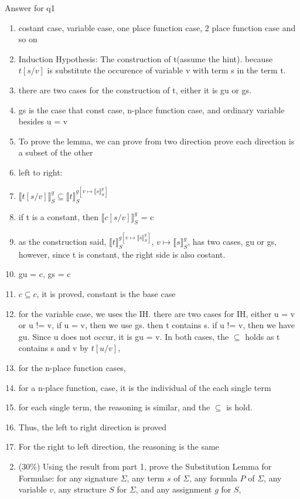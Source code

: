 \documentclass[10pt]{article}
\begin{document}
Answer for q1 
\begin{enumerate}
    \item costant case, variable case, one place function case, 2 place function case and so on 
    \item Induction Hypothesis: The construction of t(assume the hint). because $t[s/v]$ is substitute the occurence of variable v with term s in the term t. 
    \item there are two cases for the construction of t, either it is gu or gs. 
    \item gs is the case that const case, n-place function case, and ordinary variable besides u = v
    \item To prove the lemma, we can prove from two direction prove each direction is a subset of the other
    \item left to right:
    \item $\llbracket t[s / v] \rrbracket_{S}^{g} \subseteq \llbracket t \rrbracket_{S}^{g\left[v \mapsto \llbracket s \rrbracket_{S}^{g}\right]}$
    \item if t is a constant, then $\llbracket c[s / v] \rrbracket_{S}^{g}$ = c 
    \item as the construction said, $\llbracket t \rrbracket_{S}^{g\left[v \mapsto \llbracket s \rrbracket_{S}^{g}\right]}$, $v \mapsto \llbracket s \rrbracket_{S}^{g}$, has two cases, gu or gs, however, since t is constant, the right side is also costant.
    \item gu = c, gs = c 
    \item $c \subseteq c$, it is proved, constant is the base case 
    \item for the variable case, we uses the IH. there are two cases for IH, either u = v or u != v, if u = v, then we use gs. then t contains s. if u != v, then we have gu. Since u does not occur, it is gu = v. In both cases, the $\subseteq$ holds as t contains s and v by $t[u/v]$,
    \item for the n-place function cases, 
    \item for a n-place function, case, it is the individual of the each single term
    \item for each single term, the reasoning is similar, and the $\subseteq$ is hold. 
    \item Thus, the left to right direction is proved
    \item For the right to left direction, the reasoning is the same
    \end{enumerate}
\begin{enumerate}
  \setcounter{enumi}{1}
  \item (30\%) Using the result from part 1, prove the Substitution Lemma for Formulae: for any signature $\Sigma$, any term $s$ of $\Sigma$, any formula $P$ of $\Sigma$, any variable $v$, any structure $S$ for $\Sigma$, and any assignment $g$ for $S$,
\end{enumerate}
\end{document}
